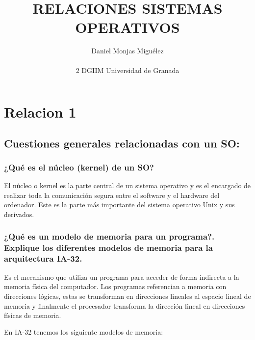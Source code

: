 \documentclass{article}
\author{Daniel Monjas Migu\'elez 
 		\\ \\ 2 DGIIM Universidad de Granada}
\title{RELACIONES SISTEMAS OPERATIVOS}
\begin{document}
\maketitle
\newpage
\tableofcontents
\newpage

	\section{Relacion 1}
		\subsection[Pregunta 1]{Cuestiones generales relacionadas con un SO:}
			\subsubsection*{¿Qué es el núcleo (kernel) de un SO?}
				El núcleo o kernel es la parte central de un sistema operativo y es el encargado de realizar toda la comunicación segura entre el software y el hardware del ordenador. Este es la parte más importante del sistema operativo Unix y sus derivados.
			
			\subsubsection*{¿Qué es un modelo de memoria para un programa?. Explique los diferentes modelos de memoria para la arquitectura IA-32.}
				Es el mecanismo que utiliza un programa para acceder de forma indirecta a la memoria física del computador. Los programas referencian a memoria con direcciones lógicas, estas se transforman en direcciones lineales al espacio lineal de memoria y finalmente el procesador transforma la dirección lineal en direcciones físicas de memoria.
				
				En IA-32 tenemos los siguiente modelos de memoria:
				
\end{document}
